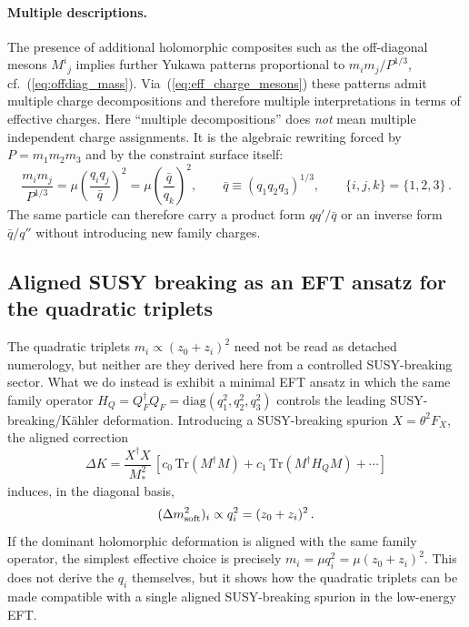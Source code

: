 \documentclass[11pt,a4paper]{article}
\newcommand{\Tr}{\mathrm{Tr}}
\newcommand{\diag}{\mathrm{diag}}
\begin{document}
\paragraph{Multiple descriptions.}
The presence of additional holomorphic composites such as the off-diagonal
mesons $M^i{}_j$ implies further Yukawa patterns proportional to
$m_i m_j/P^{1/3}$, cf.~(\ref{eq:offdiag_mass}).  Via~(\ref{eq:eff_charge_mesons})
these patterns admit multiple charge decompositions and therefore multiple
interpretations in terms of effective charges.
Here ``multiple decompositions'' does \emph{not} mean multiple independent
charge assignments.  It is the algebraic rewriting forced by
$P=m_1m_2m_3$ and by the constraint surface itself:
\begin{equation}
  \frac{m_i m_j}{P^{1/3}}
  = \mu\left(\frac{q_i q_j}{\bar q}\right)^2
  = \mu\left(\frac{\bar q}{q_k}\right)^2,
  \qquad
  \bar q\equiv(q_1q_2q_3)^{1/3},\qquad \{i,j,k\}=\{1,2,3\}\,.
  \label{eq:multiple_decomposition}
\end{equation}
The same particle can therefore carry a product form $qq'/\bar q$ or an
inverse form $\bar q/q''$ without introducing new family charges.

\subsection{Aligned SUSY breaking as an EFT ansatz for the quadratic triplets}
\label{sec:soft_origin}

The quadratic triplets $m_i\propto (z_0+z_i)^2$ need not be read as detached
numerology, but neither are they derived here from a controlled SUSY-breaking
sector.  What we do instead is exhibit a minimal EFT ansatz in which the same
family operator
$H_Q=Q_F^\dagger Q_F=\diag(q_1^2,q_2^2,q_3^2)$ controls the leading
SUSY-breaking/K\"ahler deformation.  Introducing a SUSY-breaking spurion
$X=\theta^2 F_X$, the aligned correction
\begin{equation}
  \Delta K
  = \frac{X^\dagger X}{M_*^2}\,
    \left[
      c_0\,\Tr(M^\dagger M)
      + c_1\,\Tr(M^\dagger H_Q M)
      + \cdots
    \right]
  \label{eq:DeltaK_HQ}
\end{equation}
induces, in the diagonal basis,
\begin{equation}
  (\Delta m^2_{\rm soft})_i \propto q_i^2 = (z_0+z_i)^2\,.
  \label{eq:soft_qsquare}
\end{equation}
If the dominant holomorphic deformation is aligned with the same family
operator, the simplest effective choice is precisely
$m_i=\mu q_i^2=\mu(z_0+z_i)^2$.
This does not derive the $q_i$ themselves, but it shows how the quadratic
triplets can be made compatible with a single aligned SUSY-breaking spurion in
the low-energy EFT.
\end{document}
